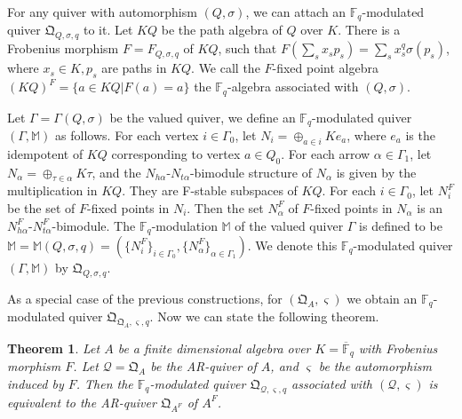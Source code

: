 \documentclass[12pt]{amsart}
\newtheorem{theorem}{Theorem}[section]
\begin{document}
For any quiver with automorphism $(Q,\sigma)$, we can attach an $\mathbb{F}_q$-modulated quiver $\mathfrak{Q}_{Q,\sigma,q}$ to it.
Let $KQ$ be the path algebra of $Q$ over $K$.
There is a Frobenius morphism $F=F_{Q,\sigma,q}$ of $KQ$, such that $F(\sum_{s} x_s p_s) = \sum_s x_s^q \sigma (p_s)$, where $x_s \in K,p_s$ are paths in $KQ$.
We call the $F$-fixed point algebra $(KQ)^F = \{  a\in KQ | F(a) = a\}$ the $\mathbb{F}_q$-algebra associated with $(Q,\sigma)$.

Let $\Gamma=\Gamma(Q,\sigma)$ be the valued quiver,
we define an $\mathbb{F}_q$-modulated quiver $(\Gamma,\mathbb{M})$ as follows.
For each vertex $i\in \Gamma_0$, let $N_i = \oplus_{a\in i} Ke_a$, where $e_a$ is the idempotent of $KQ$ corresponding to vertex $a\in Q_0$.
For each arrow $\alpha \in \Gamma_1$, let $N_{\alpha} = \oplus_{\tau\in \alpha} K\tau$, and the $N_{h\alpha}$-$N_{t\alpha}$-bimodule structure of $N_{\alpha}$ is given by the multiplication in $KQ$.
They are F-stable subspaces of $KQ$.
For each $i\in \Gamma_0$, let $N_i^F$ be the set of $F$-fixed points in $N_i$. 
Then the set $N_{\alpha}^F$ of $F$-fixed points in $N_{\alpha}$ is an $N_{h\alpha}^F$-$N_{t\alpha}^F$-bimodule.
The $\mathbb{F}_q$-modulation $\mathbb{M}$ of the valued quiver $\Gamma$ is defined to be $\mathbb{M} = \mathbb{M}(Q,\sigma,q) = ( \{ N_i^F \}_{i\in \Gamma_0}, \{  N_{\alpha}^F \}_{\alpha \in \Gamma_1} )$.
We denote this $\mathbb{F}_q$-modulated quiver $(\Gamma,\mathbb{M})$ by $\mathfrak{Q}_{Q,\sigma,q}$.

As a special case of the previous constructions, for $(\mathfrak{Q}_A,\varsigma)$ we obtain an $\mathbb{F}_q$-modulated quiver $\mathfrak{Q}_{\mathfrak{Q}_A,\varsigma,q}$. %
Now we can state the following theorem.

\begin{theorem} \label{deng} \cite[Thm 3.30]{Deng}
    Let $A$ be a finite dimensional algebra over $K=\overline{\mathbb{F}}_q$ with Frobenius morphism $F$. 
    Let $\mathcal{Q} = \mathfrak{Q}_A$ be the AR-quiver of $A$, and $\varsigma$ be the automorphism induced by $F$.
    Then the $\mathbb{F}_q$-modulated quiver $\mathfrak{Q}_{\mathcal{Q},\varsigma,q } $ associated with $(\mathcal{Q},\varsigma)$ is equivalent to the AR-quiver $\mathfrak{Q}_{A^F}$ of $A^F$.
\end{theorem}
\end{document}

